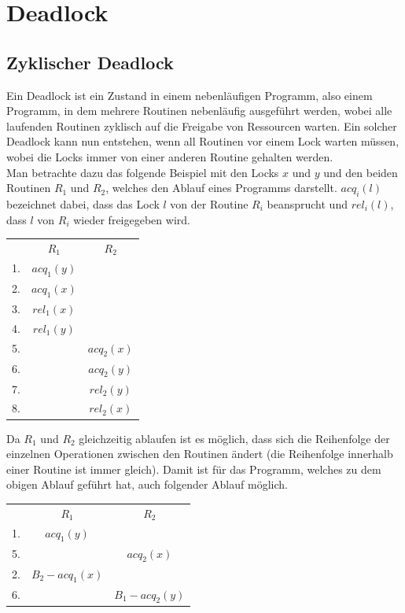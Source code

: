 \section{Deadlock} \label{Kap::Theo:Deadlocks}
\subsection{Zyklischer Deadlock}
Ein Deadlock ist ein Zustand in einem nebenläufigen Programm, also einem 
Programm, in dem mehrere Routinen nebenläufig ausgeführt werden, wobei alle 
laufenden Routinen zyklisch auf die Freigabe von Ressourcen warten.
Ein solcher Deadlock kann nun entstehen, wenn all Routinen vor einem Lock warten 
müssen, wobei die Locks immer von einer anderen Routine gehalten werden.\\
Man betrachte dazu das folgende Beispiel \cite{sulzmann} mit den Locks $x$ und $y$ 
und den beiden Routinen $R_1$ und $R_2$, welches den Ablauf eines Programms 
darstellt. $acq_i(l)$ bezeichnet dabei, dass das Lock $l$ von der Routine $R_i$ 
beansprucht und $rel_i(l)$, dass $l$ von $R_i$ wieder freigegeben wird.
\begin{table}[H]
    \centering
    \begin{tabular}{ccc}
       & $R_1$        & $R_2$          \\
    1. & $acq_{1}(y)$ &                \\
    2. & $acq_{1}(x)$ &                \\
    3. & $rel_{1}(x)$ &                \\
    4. & $rel_{1}(y)$ &                \\
    5. &              & $acq_{2}(x)$ \\
    6. &              & $acq_{2}(y)$ \\
    7. &              & $rel_{2}(y)$ \\
    8. &              & $rel_{2}(x)$
    \end{tabular}
\end{table}
Da $R_1$ und $R_2$ gleichzeitig ablaufen ist es möglich, dass sich die 
Reihenfolge der einzelnen Operationen zwischen den Routinen ändert (die Reihenfolge
innerhalb einer Routine ist immer gleich). Damit ist für das Programm, welches 
zu dem obigen Ablauf geführt hat, auch folgender Ablauf möglich. 
\begin{table}[H]
    \centering
    \begin{tabular}{ccc}
       & $R_1$          & $R_2$          \\
    1. & $acq_{1}(y)$ &                \\
    5. &                & $acq_{2}(x)$ \\
    2. & $B_2-acq_{1}(x)$ &                \\
    6. &                & $B_1-acq_{2}(y)$
    \end{tabular}
\end{table}

